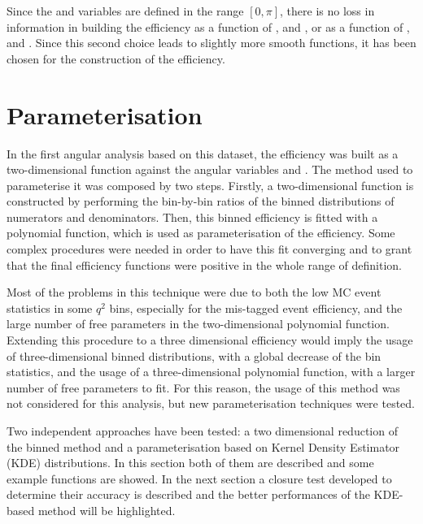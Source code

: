 
Since the \TK and \TK variables are defined in the range $[0,\pi]$, there is no loss in information in building the efficiency as a function of \TK, \TL and \PHI, or as a function of \cTK, \cTL and \PHI. Since this second choice leads to slightly more smooth functions, it has been chosen for the construction of the efficiency. 

\section{Parameterisation}\label{sec:eff_param}

In the first angular analysis based on this dataset, the efficiency was built as a two-dimensional function against the angular variables \TK and \TL.
The method used to parameterise it was composed by two steps.
Firstly, a two-dimensional function is constructed by performing the bin-by-bin ratios of the binned distributions of numerators and denominators.
Then, this binned efficiency is fitted with a polynomial function, which is used as parameterisation of the efficiency.
Some complex procedures were needed in order to have this fit converging and to grant that the final efficiency functions were positive in the whole range of definition.

Most of the problems in this technique were due to both the low MC event statistics in some $q^2$ bins, especially for the mis-tagged event efficiency, and the large number of free parameters in the two-dimensional polynomial function.
Extending this procedure to a three dimensional efficiency would imply the usage of three-dimensional binned distributions, with a global decrease of the bin statistics, and the usage of a three-dimensional polynomial function, with a larger number of free parameters to fit.
For this reason, the usage of this method was not considered for this analysis, but new parameterisation techniques were tested.

Two independent approaches have been tested: a two dimensional reduction of the binned method and a parameterisation based on Kernel Density Estimator (KDE) distributions.
In this section both of them are described and some example functions are showed.
In the next section a closure test developed to determine their accuracy is described and the better performances of the KDE-based method will be highlighted.

